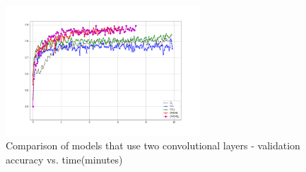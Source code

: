 \begin{figure}[htb!]
\centering\includegraphics[width=0.65\textwidth]{content/CL-CCL-CCLL-CMCML-CMCMLL.png}
\caption[Two convolutional layers]{\label{fig:twoconvs}Comparison of models that use two convolutional layers - validation accuracy vs. time(minutes)}
\end{figure}
